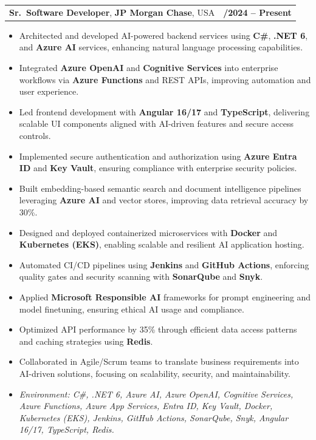 \documentclass[letterpaper,11pt]{article}
\makeatletter
\newcommand{\resumeItem}[1]{
  \item\footnotesize{
    {#1 \vspace{-2pt}}
  }
}
\newcommand{\resumeSubheading}[4]{
  \vspace{-2pt}\item
    \begin{tabular*}{1.0\textwidth}[t]{l@{\extracolsep{\fill}}r}
      \textbf{\fontsize{10pt}{14pt}\selectfont #3}, \textbf{\fontsize{10pt}{14pt}\selectfont #1}, \fontsize{10pt}{14pt}\selectfont #4 & \textbf{\fontsize{10pt}{14pt}\selectfont #2} \\
    \end{tabular*}\vspace{-7pt}
}
\newcommand{\resumeItemListStart}{\begin{itemize}[leftmargin=*]}
\newcommand{\resumeItemListEnd}{\end{itemize}\vspace{-5pt}}
\makeatother
\begin{document}
\resumeSubheading
{JP Morgan Chase}{09/2024 -- Present}
{Sr.\ Software Developer}{USA}
\resumeItemListStart
  \resumeItem{Architected and developed AI-powered backend services using \textbf{C\#}, \textbf{.NET 6}, and \textbf{Azure AI} services, enhancing natural language processing capabilities.}
  \resumeItem{Integrated \textbf{Azure OpenAI} and \textbf{Cognitive Services} into enterprise workflows via \textbf{Azure Functions} and REST APIs, improving automation and user experience.}
  \resumeItem{Led frontend development with \textbf{Angular 16/17} and \textbf{TypeScript}, delivering scalable UI components aligned with AI-driven features and secure access controls.}
  \resumeItem{Implemented secure authentication and authorization using \textbf{Azure Entra ID} and \textbf{Key Vault}, ensuring compliance with enterprise security policies.}
  \resumeItem{Built embedding-based semantic search and document intelligence pipelines leveraging \textbf{Azure AI} and vector stores, improving data retrieval accuracy by 30\%.}
  \resumeItem{Designed and deployed containerized microservices with \textbf{Docker} and \textbf{Kubernetes (EKS)}, enabling scalable and resilient AI application hosting.}
  \resumeItem{Automated CI/CD pipelines using \textbf{Jenkins} and \textbf{GitHub Actions}, enforcing quality gates and security scanning with \textbf{SonarQube} and \textbf{Snyk}.}
  \resumeItem{Applied \textbf{Microsoft Responsible AI} frameworks for prompt engineering and model finetuning, ensuring ethical AI usage and compliance.}
  \resumeItem{Optimized API performance by 35\% through efficient data access patterns and caching strategies using \textbf{Redis}.}
  \resumeItem{Collaborated in Agile/Scrum teams to translate business requirements into AI-driven solutions, focusing on scalability, security, and maintainability.}
  \resumeItem{\textit{Environment: C\#, .NET 6, Azure AI, Azure OpenAI, Cognitive Services, Azure Functions, Azure App Services, Entra ID, Key Vault, Docker, Kubernetes (EKS), Jenkins, GitHub Actions, SonarQube, Snyk, Angular 16/17, TypeScript, Redis.}}
\resumeItemListEnd
\end{document}
